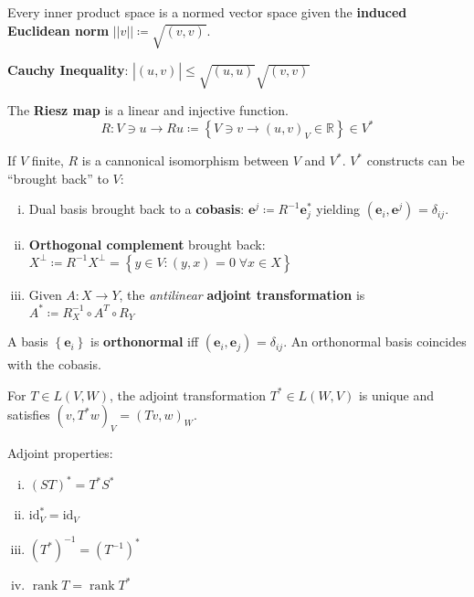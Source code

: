 \documentclass[letterpaper,11pt]{amsart}
\newcommand{\norm}[1]{\left|\left|{#1}\right|\right|}
\newcommand{\abs}[1]{\left|{#1}\right|}
\newcommand{\innerprod}[3][]{{\left({#2},{#3}\right)}_{#1}\xspace{}}
\newcommand{\reals}{\mathbb{R}}
\newcommand{\keyphrase}[1]{\textbf{#1}}
\DeclareMathOperator{\rank}{rank}
\begin{document}
Every inner product space is a normed vector space given the 
\keyphrase{induced Euclidean norm} $\norm{v} \coloneqq \sqrt{\innerprod{v}{v}}$.

\keyphrase{Cauchy Inequality}:
$\abs{\innerprod{u}{v}}\leq{}\sqrt{\innerprod{u}{u}}\sqrt{\innerprod{v}{v}}$

The \keyphrase{Riesz map} is a linear and injective function.  
\[
    R:V\ni{}u\to{}Ru 
    \coloneqq \left\{ V\ni{v}\to\innerprod[V]{u}{v}\in\reals\right\}\in{}V^{*}
\]

If $V$ finite, $R$ is a cannonical isomorphism between $V$ and $V^{*}$.
$V^{*}$ constructs can be ``brought back'' to $V$:
\begin{enumerate}[(i)]
    \item Dual basis brought back to a \keyphrase{cobasis}:
        $\mathbf{e}^{j} \coloneqq R^{-1}\mathbf{e}_{j}^{*}$
        yielding $\innerprod{\mathbf{e}_{i}}{\mathbf{e}^{j}} = \delta_{ij}$.
    \item \keyphrase{Orthogonal complement} brought back:
        $X^{\bot} \coloneqq R^{-1}X^{\bot} = 
        \left\{ y\in{}V:\innerprod{y}{x}=0 \;\forall{}x\in{}X \right\}$
    \item Given $A:X\to{}Y$, the 
        \emph{antilinear} \keyphrase{adjoint transformation} is
        $A^{*}\coloneqq{}R^{-1}_{X}\circ{}A^{T}\circ{}R_{Y}$
\end{enumerate}

A basis $\left\{ \mathbf{e}_{i} \right\}$ is \keyphrase{orthonormal} iff
$\innerprod{\mathbf{e}_{i}}{\mathbf{e}_{j}}=\delta_{ij}$.  An orthonormal
basis coincides with the cobasis.

For $T\in{}L(V,W)$, the adjoint transformation $T^{*}\in{}L(W,V)$ 
is unique and satisfies $\innerprod[V]{v}{T^{*}w} = \innerprod[W]{Tv}{w}$.

Adjoint properties:
\begin{enumerate}[(i)]
    \item $\left( S T \right)^{*} = T^{*}S^{*}$
    \item $\textrm{id}_{V}^{*} = \textrm{id}_{V}$
    \item $\left( T^{*} \right)^{-1} = \left( T^{-1} \right)^{*}$
    \item $\rank T = \rank T^{*}$
\end{enumerate}
\end{document}
